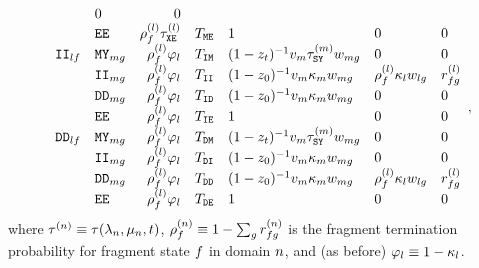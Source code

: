 \begin{equation}
\begin{array}{llrclll}
& 0 & 0 \\
  & {\tt E}{\tt E} & \rho^{(l)}_f
\tau_{{\tt X}{\tt E}}^{(l)}
& T_{{\tt M}{\tt E}} & 1
& 0 & 0 \\
{\tt I}{\tt I}_{lf} & {\tt M}{\tt Y}_{mg} & \rho^{(l)}_f
\varphi_l
& T_{{\tt I}{\tt M}} &
(1 - z_t)^{-1} v_m
\tau_{{\tt S}{\tt Y}}^{(m)}
w_{mg}
& 0 & 0 \\
  & {\tt I}{\tt I}_{mg} & \rho^{(l)}_f
\varphi_l
& T_{{\tt I}{\tt I}} &
(1 - z_0)^{-1} v_m
\kappa_m
w_{mg}
& \rho^{(l)}_f \kappa_l w_{lg}
& r^{(l)}_{fg}
\\
  & {\tt D}{\tt D}_{mg} & \rho^{(l)}_f
\varphi_l
& T_{{\tt I}{\tt D}} &
(1 - z_0)^{-1} v_m
\kappa_m
w_{mg}
 & 0 & 0 \\
  & {\tt E}{\tt E} & \rho^{(l)}_f
\varphi_l & T_{{\tt I}{\tt E}} & 1
 & 0 & 0 \\
{\tt D}{\tt D}_{lf} & {\tt M}{\tt Y}_{mg} & \rho^{(l)}_f
\varphi_l
& T_{{\tt D}{\tt M}} &
(1 - z_t)^{-1} v_m
\tau_{{\tt S}{\tt Y}}^{(m)}
w_{mg}
 & 0 & 0 \\
  & {\tt I}{\tt I}_{mg} & \rho^{(l)}_f
\varphi_l
& T_{{\tt D}{\tt I}} &
(1 - z_0)^{-1} v_m
\kappa_m
w_{mg}
 & 0 & 0 \\
  & {\tt D}{\tt D}_{mg} & \rho^{(l)}_f
\varphi_l
& T_{{\tt D}{\tt D}} &
(1 - z_0)^{-1} v_m
\kappa_m
w_{mg}
& \rho^{(l)}_f \kappa_l w_{lg}
& r^{(l)}_{fg}
 \\
  & {\tt E}{\tt E} & \rho^{(l)}_f
\varphi_l & T_{{\tt D}{\tt E}} & 1
 & 0 & 0\\
\end{array},
\label{eq:mixdom_transitions}
\end{equation}
where $\tau^{(n)} \equiv \tau(\lambda_n,\mu_n,t)$,
$\rho^{(n)}_f \equiv 1 - \sum_g r^{(n)}_{fg}$
is the fragment termination probability for fragment state $f$ in domain $n$,
and (as before) $\varphi_l \equiv 1 - \kappa_l$.

